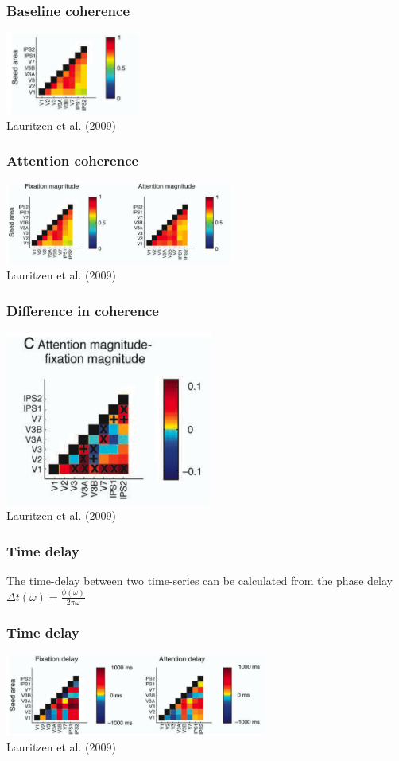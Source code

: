 \documentclass{beamer}
\begin{document}
\begin{frame}
\frametitle{Baseline coherence}
\includegraphics[height=2.7cm]{figures/lauritzen3}
\\
\hfill 
Lauritzen et al. (2009)
\end{frame}

\begin{frame}
\frametitle{Attention coherence}
\includegraphics[height=2.7cm]{figures/lauritzen4}
\\
\hfill 
Lauritzen et al. (2009)
\end{frame}

\begin{frame}
\frametitle{Difference in coherence}
\includegraphics[height=5.7cm]{figures/lauritzen5}
\\
\hfill 
Lauritzen et al. (2009)
\end{frame}


\begin{frame}
\frametitle{Time delay}
The time-delay between two time-series can be calculated from the phase delay 
\\ 
\pause
\vspace{1cm}
$\Delta t (\omega) = \frac{\phi(\omega)}{2 \pi \omega}$
\end{frame}

\begin{frame}
\frametitle{Time delay}
\includegraphics[height=2.7cm]{figures/lauritzen6}
\\
\hfill 
Lauritzen et al. (2009)
\end{frame}
\end{document}
